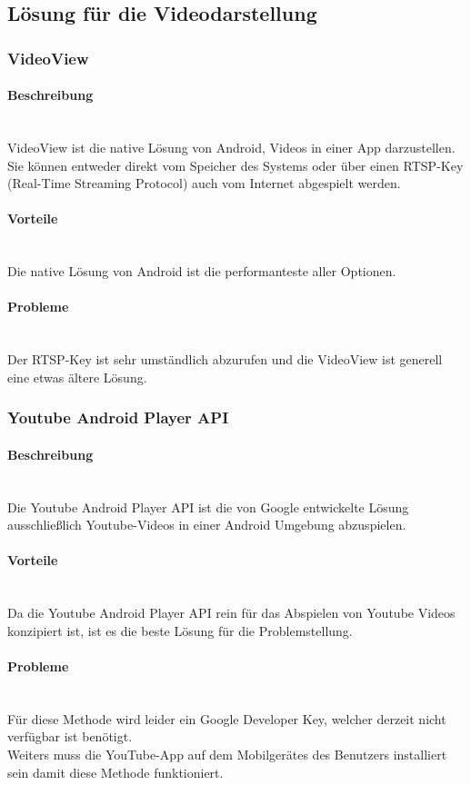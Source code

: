 \documentclass[FIPLY_base.tex]{subfiles}
\begin{document}
\subsection{Lösung für die Videodarstellung}
\subsubsection{VideoView}
\paragraph{Beschreibung}\ \\
VideoView ist die native Lösung von Android, Videos in einer App darzustellen. Sie können entweder direkt vom Speicher des Systems oder über einen RTSP-Key (Real-Time Streaming Protocol) auch vom Internet  abgespielt werden.
\paragraph{Vorteile}\ \\
Die native Lösung von Android ist die performanteste aller Optionen.
\paragraph{Probleme}\ \\
Der RTSP-Key ist sehr umständlich abzurufen und die VideoView ist generell eine etwas ältere Lösung.

\subsubsection{Youtube Android Player API}
\paragraph{Beschreibung}\ \\
Die Youtube Android Player API ist die von Google entwickelte Lösung ausschließlich Youtube-Videos in einer Android Umgebung abzuspielen.
\paragraph{Vorteile}\ \\
Da die Youtube Android Player API rein für das Abspielen von Youtube Videos konzipiert ist, ist es die beste Lösung für die Problemstellung.
\paragraph{Probleme}\ \\
Für diese Methode wird leider ein Google Developer Key, welcher derzeit nicht verfügbar ist benötigt.\ \\
Weiters muss die YouTube-App auf dem Mobilgerätes des Benutzers installiert sein damit diese Methode funktioniert.
\newpage
\end{document}
